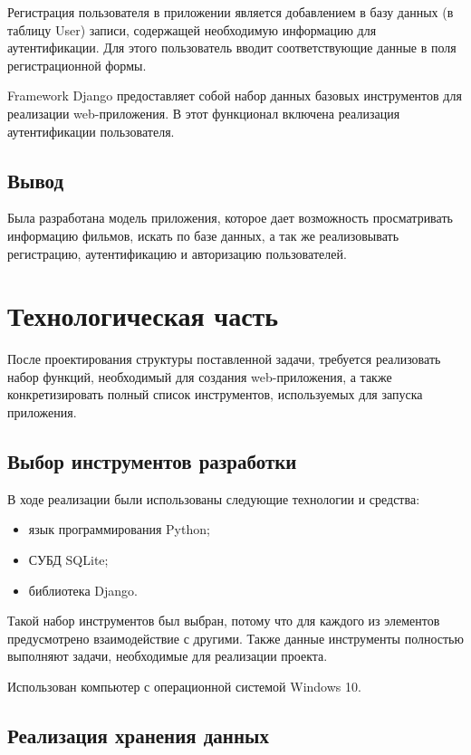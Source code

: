 \documentclass[a4paper, 14pt]{article}
\begin{document}
	Регистрация пользователя в приложении является добавлением в базу данных (в таблицу User) записи, содержащей необходимую информацию для аутентификации. Для этого пользователь вводит соответствующие данные  в поля регистрационной формы.
	
	Framework Django предоставляет собой набор данных базовых инструментов для реализации web-приложения. В этот функционал включена реализация аутентификации пользователя.
	
	\subsection{Вывод}
	
	Была разработана модель приложения, которое дает возможность просматривать информацию фильмов, искать по базе данных, а так же реализовывать регистрацию, аутентификацию и авторизацию пользователей.
	
	\newpage
	\section{Технологическая часть}
	
	После проектирования структуры поставленной задачи, требуется реализовать набор функций, необходимый для создания web-приложения, а также конкретизировать полный список инструментов, используемых для запуска приложения.
	
	\subsection{Выбор инструментов разработки}%
	\setcounter{subsection}{1}
	
	В ходе реализации были использованы следующие технологии и средства:
	
	\begin{itemize}
		\item язык программирования Python;
		\item СУБД SQLite;
		\item библиотека Django.
	\end{itemize}
	
	Такой набор инструментов был выбран, потому что для каждого из элементов предусмотрено взаимодействие с другими.
	Также данные инструменты полностью выполняют задачи, необходимые для реализации проекта.
	
	Использован компьютер с операционной системой Windows 10.
	
	\subsection{Реализация хранения данных}
	
\end{document}
